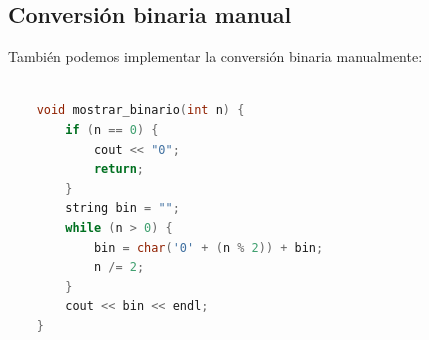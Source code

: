\subsection{Conversión binaria manual}

También podemos implementar la conversión binaria manualmente:

\begin{lstlisting}[language=C++, caption=Conversión manual de decimal a binario]
	
	void mostrar_binario(int n) {
		if (n == 0) {
			cout << "0";
			return;
		}
		string bin = "";
		while (n > 0) {
			bin = char('0' + (n % 2)) + bin;
			n /= 2;
		}
		cout << bin << endl;
	}
\end{lstlisting}



 